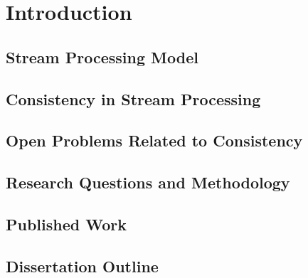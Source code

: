 \chapter{Introduction}

\section{Stream Processing Model}

\section{Consistency in Stream Processing}

\section{Open Problems Related to Consistency}

\section{Research Questions and Methodology}

\section{Published Work}

\section{Dissertation Outline}
